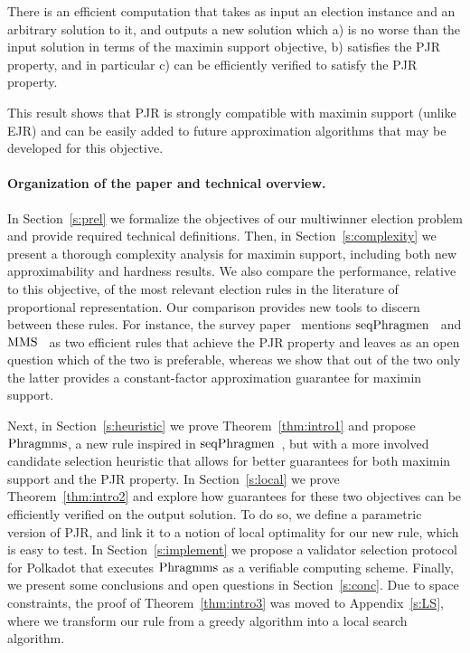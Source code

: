 \begin{theorem}\label{thm:intro3}
There is an efficient computation that takes as input an election instance and an arbitrary solution to it, and outputs a new solution which a) is no worse than the input solution in terms of the maximin support objective, b) satisfies the PJR property, and in particular c) can be efficiently verified to satisfy the PJR property.
\end{theorem}

This result shows that PJR is strongly compatible with maximin support (unlike EJR) and can be easily added to future approximation algorithms that may be developed for this objective.

\paragraph{Organization of the paper and technical overview.}
In Section~\ref{s:prel} we formalize the objectives of our multiwinner election problem and provide required technical definitions. 
Then, in Section~\ref{s:complexity} we present a thorough complexity analysis for maximin support, including both new approximability and hardness results. 
We also compare the performance, relative to this objective, of the most relevant election rules in the literature of proportional representation. 
Our comparison provides new tools to discern between these rules. For instance, the survey paper~\cite{lackner2020approval} mentions $\operatorname{seqPhragmen}$~\cite{brill2017phragmen} and $\operatorname{MMS}$~\cite{sanchez2016maximin} as two efficient rules that achieve the PJR property and leaves as an open question which of the two is preferable, whereas we show that out of the two only the latter provides a constant-factor approximation guarantee for maximin support. 

Next, in Section~\ref{s:heuristic} we prove Theorem~\ref{thm:intro1} and propose $\operatorname{Phragmms}$, a new rule inspired in $\operatorname{seqPhragmen}$~\cite{brill2017phragmen}, but with a more involved candidate selection heuristic that allows for better guarantees for both maximin support and the PJR property. 
In Section~\ref{s:local} we prove Theorem~\ref{thm:intro2} and explore how guarantees for these two objectives can be efficiently verified on the output solution. 
To do so, we define a parametric version of PJR, and link it to a notion of local optimality for our new rule, which is easy to test. 
In Section~\ref{s:implement} we propose a validator selection protocol for Polkadot that executes $\operatorname{Phragmms}$ as a verifiable computing scheme. 
Finally, we present some conclusions and open questions in Section~\ref{s:conc}. 
Due to space constraints, the proof of Theorem~\ref{thm:intro3} was moved to Appendix~\ref{s:LS}, where we transform our rule from a greedy algorithm into a local search algorithm. 

